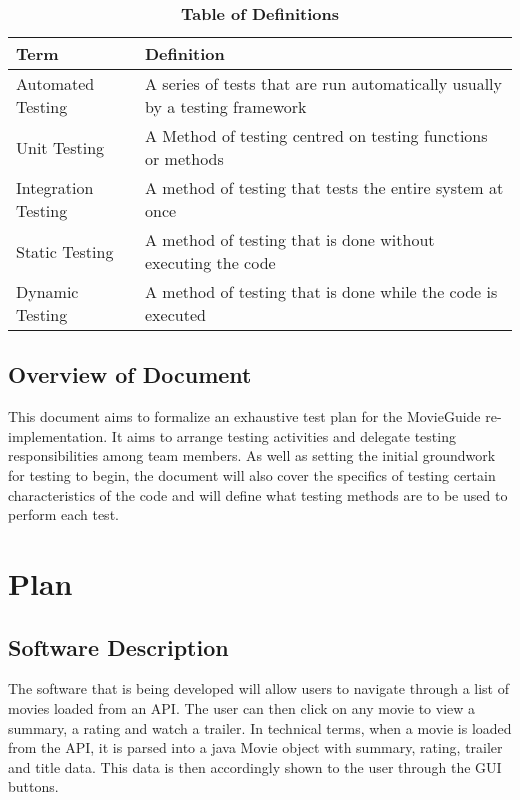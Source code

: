 \documentclass[12pt, titlepage]{article}
\begin{document}
\begin{table}[!htbp]
\caption{\textbf{Table of Definitions}} \label{Table}

\begin{tabularx}{\textwidth}{p{3.5cm}X}
\toprule
\textbf{Term} & \textbf{Definition}\\
\midrule
Automated Testing & A series of tests that are run automatically usually by a testing framework\\
Unit Testing & A Method of testing centred on testing functions or methods\\
Integration Testing & A method of testing that tests the entire system at once\\
Static Testing & A method of testing that is done without executing the code\\
Dynamic Testing & A method of testing that is done while the code is executed\\

\bottomrule
\end{tabularx}

\end{table}	

\subsection{Overview of Document}
This document aims to formalize an exhaustive test plan for the MovieGuide re-implementation. It aims to arrange testing activities and delegate testing responsibilities among team members. As well as setting the initial groundwork for testing to begin, the document will also cover the specifics of testing certain characteristics of the code and will define what testing methods are to be used to perform each test.

\section{Plan}
	
\subsection{Software Description}
The software that is being developed will allow users to navigate through a list of movies loaded from an API. The user can then click on any movie to view a summary, a rating and watch a trailer. In technical terms, when a movie is loaded from the API, it is parsed into a java Movie object with summary, rating, trailer and title data. This data is then accordingly shown to the user through the GUI buttons.
\end{document}
